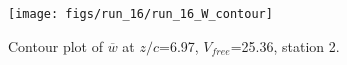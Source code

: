 \begin{figure}[H]
\centering
\texttt{[image: figs/run\_16/run\_16\_W\_contour]}
\caption{Contour plot of $\overline{w}$ at $z/c$=6.97, $V_{free}$=25.36, station 2.}
\label{fig:run_16_W_contour}
\end{figure}



